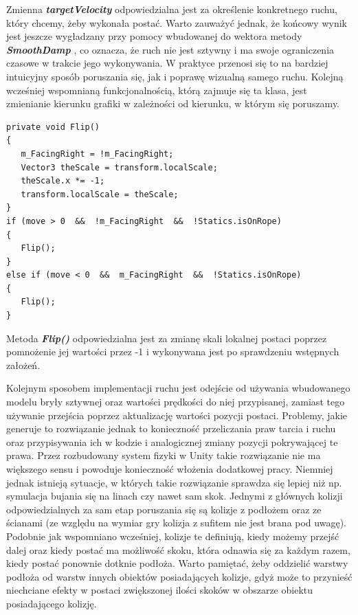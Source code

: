 \documentclass[oneside,polski,logo]{amuthesis}
\begin{document}
Zmienna \textbf{\textit{targetVelocity}} odpowiedzialna jest za określenie konkretnego ruchu, który chcemy, żeby wykonała postać. Warto zauważyć jednak, że końcowy wynik jest jeszcze wygładzany przy pomocy wbudowanej do wektora metody \textbf{\textit{SmoothDamp}} \cite{physics2}, co oznacza, że ruch nie jest sztywny i ma swoje ograniczenia czasowe w trakcie jego wykonywania. W praktyce przenosi się to na bardziej intuicyjny sposób poruszania się, jak i poprawę wizualną samego ruchu.
Kolejną wcześniej wspomnianą funkcjonalnością, którą zajmuje się ta klasa, jest zmienianie kierunku grafiki w zależności od kierunku, w którym się poruszamy.


\begin{lstlisting}[breaklines=true,
language={[Sharp]C},
rulecolor=\color{blue!80!black},
caption={Fragment klasy \texttt{CharacterController.cs}}
]
private void Flip()
{
   m_FacingRight = !m_FacingRight;
   Vector3 theScale = transform.localScale;
   theScale.x *= -1;
   transform.localScale = theScale;
}
if (move > 0  &&  !m_FacingRight  &&  !Statics.isOnRope)
{
   Flip();
}
else if (move < 0  &&  m_FacingRight  &&  !Statics.isOnRope)
{ 
   Flip();
}
\end{lstlisting}

Metoda \textbf{\textit{Flip()}} odpowiedzialna jest za zmianę skali lokalnej postaci poprzez pomnożenie jej wartości przez -1 i wykonywana jest po sprawdzeniu wstępnych założeń.

Kolejnym sposobem implementacji ruchu jest odejście od używania wbudowanego modelu bryły sztywnej oraz wartości prędkości do niej przypisanej, zamiast tego używanie przejścia poprzez aktualizację wartości pozycji postaci. Problemy, jakie generuje to rozwiązanie jednak to konieczność przeliczania praw tarcia i ruchu oraz przypisywania ich w kodzie i analogicznej zmiany pozycji pokrywającej te prawa. Przez rozbudowany system fizyki w Unity takie rozwiązanie nie ma większego sensu i powoduje konieczność włożenia dodatkowej pracy. Niemniej jednak istnieją sytuacje, w których takie rozwiązanie sprawdza się lepiej niż np. symulacja bujania się na linach czy nawet sam skok.
Jednymi z głównych kolizji odpowiedzialnych za sam etap poruszania się są kolizje z podłożem oraz ze ścianami (ze względu na wymiar gry kolizja z sufitem nie jest brana pod uwagę). Podobnie jak wspomniano wcześniej, kolizje te definiują, kiedy możemy przejść dalej oraz kiedy postać ma możliwość skoku, która odnawia się za każdym razem, kiedy postać ponownie dotknie podłoża. Warto pamiętać, żeby oddzielić warstwy podłoża od warstw innych obiektów posiadających kolizje, gdyż może to przynieść niechciane efekty w postaci zwiększonej ilości skoków w obszarze obiektu posiadającego kolizję.
\end{document}

